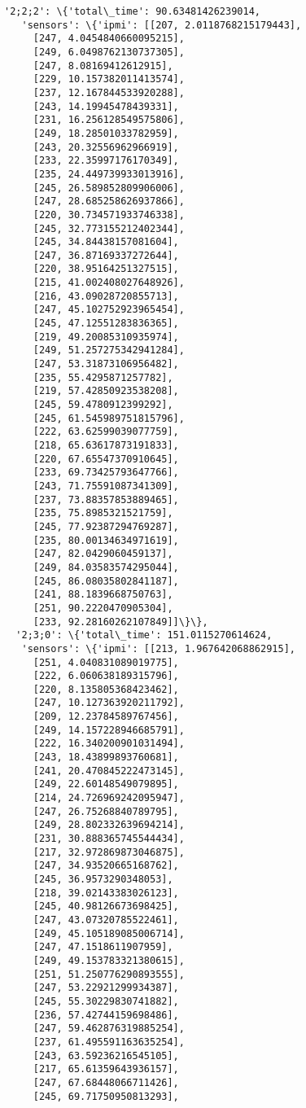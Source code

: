 \documentclass[11pt]{article}
\begin{document}
\begin{tcolorbox}[breakable, size=fbox, boxrule=.5pt, pad at break*=1mm, opacityfill=0]
\begin{Verbatim}[commandchars=\\\{\}]
  '2;2;2': \{'total\_time': 90.63481426239014,
   'sensors': \{'ipmi': [[207, 2.0118768215179443],
     [247, 4.0454840660095215],
     [249, 6.0498762130737305],
     [247, 8.08169412612915],
     [229, 10.157382011413574],
     [237, 12.167844533920288],
     [243, 14.19945478439331],
     [231, 16.256128549575806],
     [249, 18.28501033782959],
     [243, 20.32556962966919],
     [233, 22.35997176170349],
     [235, 24.449739933013916],
     [245, 26.589852809906006],
     [247, 28.685258626937866],
     [220, 30.734571933746338],
     [245, 32.773155212402344],
     [245, 34.84438157081604],
     [247, 36.87169337272644],
     [220, 38.95164251327515],
     [215, 41.002408027648926],
     [216, 43.09028720855713],
     [247, 45.102752923965454],
     [245, 47.12551283836365],
     [219, 49.20085310935974],
     [249, 51.257275342941284],
     [247, 53.31873106956482],
     [235, 55.4295871257782],
     [219, 57.42850923538208],
     [245, 59.4780912399292],
     [245, 61.545989751815796],
     [222, 63.62599039077759],
     [218, 65.63617873191833],
     [220, 67.65547370910645],
     [233, 69.73425793647766],
     [243, 71.75591087341309],
     [237, 73.88357853889465],
     [235, 75.8985321521759],
     [245, 77.92387294769287],
     [235, 80.00134634971619],
     [247, 82.0429060459137],
     [249, 84.03583574295044],
     [245, 86.08035802841187],
     [241, 88.1839668750763],
     [251, 90.2220470905304],
     [233, 92.28160262107849]]\}\},
  '2;3;0': \{'total\_time': 151.0115270614624,
   'sensors': \{'ipmi': [[213, 1.967642068862915],
     [251, 4.040831089019775],
     [222, 6.060638189315796],
     [220, 8.135805368423462],
     [247, 10.127363920211792],
     [209, 12.23784589767456],
     [249, 14.157228946685791],
     [222, 16.340200901031494],
     [243, 18.43899893760681],
     [241, 20.470845222473145],
     [249, 22.60148549079895],
     [214, 24.726969242095947],
     [247, 26.75268840789795],
     [249, 28.802332639694214],
     [231, 30.888365745544434],
     [217, 32.972869873046875],
     [247, 34.93520665168762],
     [245, 36.9573290348053],
     [218, 39.02143383026123],
     [245, 40.98126673698425],
     [247, 43.07320785522461],
     [249, 45.105189085006714],
     [247, 47.1518611907959],
     [249, 49.153783321380615],
     [251, 51.250776290893555],
     [247, 53.22921299934387],
     [245, 55.30229830741882],
     [236, 57.42744159698486],
     [247, 59.462876319885254],
     [237, 61.495591163635254],
     [243, 63.59236216545105],
     [217, 65.61359643936157],
     [247, 67.68448066711426],
     [245, 69.71750950813293],

\end{Verbatim}
\end{tcolorbox}
\end{document}
